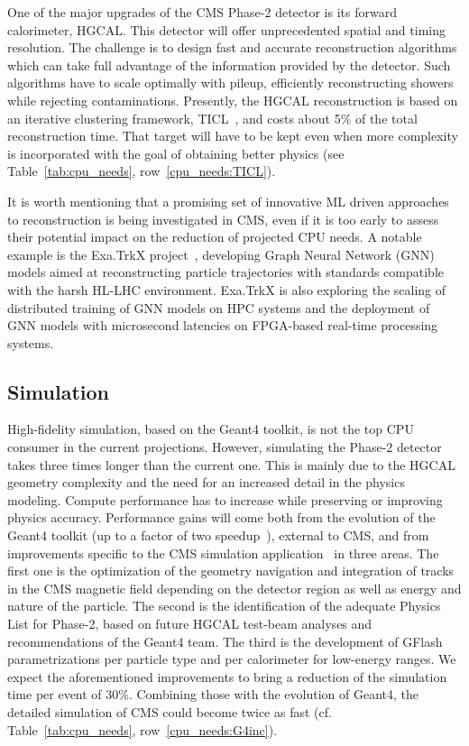 \documentclass{cmspaper}
\begin{document}
One of the major upgrades of the CMS Phase-2 detector is its forward calorimeter, HGCAL. This detector will offer unprecedented spatial and timing resolution. The challenge is to design fast and accurate reconstruction algorithms which can take full advantage of the information provided by the detector. Such algorithms have to scale optimally with pileup, efficiently reconstructing showers while rejecting contaminations. Presently, the HGCAL reconstruction is based on an iterative clustering framework, TICL~\cite{gouskos_loukas_2020_4088464}, and costs about 5\% of the total reconstruction time. That target will have to be kept even when more complexity is incorporated with the goal of obtaining better physics (see Table~\ref{tab:cpu_needs}, row~\ref{cpu_needs:TICL}).

It is worth mentioning that a promising set of innovative ML driven approaches to reconstruction is being investigated in CMS, even if it is too early to assess their potential impact on the reduction of projected CPU needs. A notable example is the Exa.TrkX project~\cite{exatrkx}, developing Graph Neural Network (GNN) models aimed at reconstructing particle trajectories with standards compatible with the harsh HL-LHC environment. Exa.TrkX is also exploring the scaling of distributed training of GNN models on HPC systems and the deployment of GNN models with microsecond latencies on FPGA-based real-time processing systems. 

\subsection{Simulation}
\label{subsec:cpu_needs_sim}
High-fidelity simulation, based on the Geant4 toolkit, is not the top CPU consumer in the current projections. However, simulating the Phase-2 detector takes three times longer than the current one. This is mainly due to the HGCAL geometry complexity and the need for an increased detail in the physics modeling. Compute performance has to increase while preserving or improving physics accuracy. Performance gains will come both from the evolution of the Geant4 toolkit (up to a factor of two speedup~\cite{verderi_HSF}), external to CMS, and from improvements specific to the CMS simulation application~\cite{Pedro:201921402036} in three areas. The first one is the optimization of the geometry navigation and integration of tracks in the CMS magnetic field depending on the detector region as well as energy and nature of the particle. The second is the identification of the adequate Physics List for Phase-2, based on future HGCAL test-beam analyses and recommendations of the Geant4 team. The third is the development of GFlash~\cite{Grindhammer:420530} parametrizations per particle type and per calorimeter for low-energy ranges. 
We expect the aforementioned improvements to bring a reduction of the simulation time per event of 30\%. Combining those with the evolution of Geant4, the detailed simulation of CMS could become twice as fast (cf. Table~\ref{tab:cpu_needs}, row~\ref{cpu_needs:G4inc}). 
\end{document}
